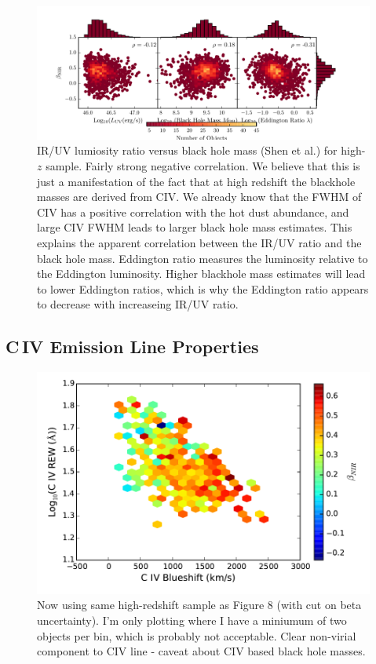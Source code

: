 \begin{figure}
  \includegraphics[width=\textwidth]{figures/chapter06/correlations_highz}
   \caption{IR/UV lumiosity ratio versus black hole mass (Shen et al.) for high-$z$ sample. Fairly strong negative correlation. We believe that this is just a manifestation of the fact that at high redshift the blackhole masses are derived from CIV. We already know that the FWHM of CIV has a positive correlation with the hot dust abundance, and large CIV FWHM leads to larger black hole mass estimates. This explains the apparent correlation between the IR/UV ratio and the black hole mass. Eddington ratio measures the luminosity relative to the Eddington luminosity. Higher blackhole mass estimates will lead to lower Eddington ratios, which is why the Eddington ratio appears to decrease with increaseing IR/UV ratio.}
\end{figure}

\subsection{C\,IV Emission Line Properties}

\begin{figure}
\centering
  \includegraphics[width=\columnwidth]{figures/chapter06/civ_2d}
\caption{Now using same high-redshift sample as Figure 8 (with cut on beta uncertainty). I'm only plotting where I have a miniumum of two objects per bin, which is probably not acceptable. Clear non-virial component to CIV line - caveat about CIV based black hole masses. }
  \label{fig:fig}
\end{figure}



